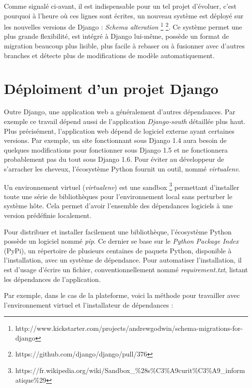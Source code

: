 \documentclass[a4paper,12pt]{article}
\begin{document}
Comme signalé ci-avant, il est indispensable pour un tel projet d'évoluer, c'est pourquoi à
l'heure où ces lignes sont écrites, un nouveau système est déployé sur
les nouvelles versions de Django : \textit{Schema alteration}
\footnote{http://www.kickstarter.com/projects/andrewgodwin/schema-migrations-for-django}
\footnote{https://github.com/django/django/pull/376}. Ce système permet
une plus grande flexibilité, est intégré à Django lui-même, possède un
format de migration beaucoup plus lisible, plus facile à rebaser ou à
fusionner avec d'autres branches et détecte plus de modifications de modèle
automatiquement.


\section{Déploiment d'un projet Django}

Outre Django, une application web a généralement d'autres dépendances. Par exemple
ce travail dépend aussi de l'application \textit{Django-south} détaillée plus haut.
Plus précisément, l'application web dépend de logiciel externe ayant certaines versions.
Par exemple, un site fonctionnant sous Django 1.4 aura besoin de quelques modifications
pour fonctionner sous Django 1.5 et ne fonctionnera probablement pas du tout sous
Django 1.6. Pour éviter au développeur de s'arracher les cheveux, l'écosystème Python
fournit un outil, nommé \textit{virtualenv}.

Un environnement virtuel (\textit{virtualenv}) est une sandbox
\footnote{https://fr.wikipedia.org/wiki/Sandbox\_\%28s\%C3\%A9curit\%C3\%A9\_informatique\%29}
permettant d'installer toute une série de bibliothèques pour l'environnement
local sans perturber le système hôte. Cela permet d'avoir l'ensemble des dépendances
logiciels à une version prédéfinie localement.

Pour distribuer et installer facilement une bibliothèque, l'écosystème Python
possède un logiciel nommé \textit{pip}. Ce dernier se base sur le
\textit{Python Package Index} (PyPi), un répertoire de plusieurs centaines de
paquets Python, disponible à l'installation, avec un système de dépendance.
Pour automatiser l'installation, il est d'usage d'écrire un fichier, conventionnellement
nommé \textit{requirement.txt}, listant les dépendances de l'application.

Par exemple, dans le cas de la plateforme, voici la méthode pour travailler avec  l'environnement
virtuel et l'installateur de dépendances :
\end{document}
